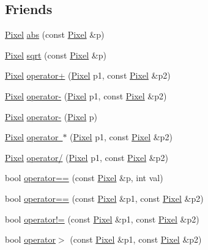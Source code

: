 \subsection*{Friends}
\begin{DoxyCompactItemize}
\item 
\mbox{\hyperlink{class_pixel}{Pixel}} \mbox{\hyperlink{class_pixel_ad6f6806d9c6750a8f5ac23e3d5733209}{abs}} (const \mbox{\hyperlink{class_pixel}{Pixel}} \&p)
\item 
\mbox{\hyperlink{class_pixel}{Pixel}} \mbox{\hyperlink{class_pixel_ac415923df8af4faf916a584a0f610c5a}{sqrt}} (const \mbox{\hyperlink{class_pixel}{Pixel}} \&p)
\item 
\mbox{\hyperlink{class_pixel}{Pixel}} \mbox{\hyperlink{class_pixel_abfbb0a3faab1f6b575e4f28b929eb95c}{operator+}} (\mbox{\hyperlink{class_pixel}{Pixel}} p1, const \mbox{\hyperlink{class_pixel}{Pixel}} \&p2)
\item 
\mbox{\hyperlink{class_pixel}{Pixel}} \mbox{\hyperlink{class_pixel_af819541eb6c95a1ee029f62c63e6dbca}{operator-\/}} (\mbox{\hyperlink{class_pixel}{Pixel}} p1, const \mbox{\hyperlink{class_pixel}{Pixel}} \&p2)
\item 
\mbox{\hyperlink{class_pixel}{Pixel}} \mbox{\hyperlink{class_pixel_a7936b70523ba5664cf90b70bf566879e}{operator-\/}} (\mbox{\hyperlink{class_pixel}{Pixel}} p)
\item 
\mbox{\hyperlink{class_pixel}{Pixel}} \mbox{\hyperlink{class_pixel_abcf09eaa1fe9387b959ea02b003c9d10}{operator $\ast$}} (\mbox{\hyperlink{class_pixel}{Pixel}} p1, const \mbox{\hyperlink{class_pixel}{Pixel}} \&p2)
\item 
\mbox{\hyperlink{class_pixel}{Pixel}} \mbox{\hyperlink{class_pixel_af34817f1230d64fb0bdfbe4641800a7c}{operator/}} (\mbox{\hyperlink{class_pixel}{Pixel}} p1, const \mbox{\hyperlink{class_pixel}{Pixel}} \&p2)
\item 
bool \mbox{\hyperlink{class_pixel_a055a296d7cc5f82c9f87fe1ec434a5f7}{operator==}} (const \mbox{\hyperlink{class_pixel}{Pixel}} \&p, int val)
\item 
bool \mbox{\hyperlink{class_pixel_ad9fdc4ca4a54c2cc05f02523eb3a6a9b}{operator==}} (const \mbox{\hyperlink{class_pixel}{Pixel}} \&p1, const \mbox{\hyperlink{class_pixel}{Pixel}} \&p2)
\item 
bool \mbox{\hyperlink{class_pixel_aaa61dbcbc3587ecba5a49edb8362c311}{operator!=}} (const \mbox{\hyperlink{class_pixel}{Pixel}} \&p1, const \mbox{\hyperlink{class_pixel}{Pixel}} \&p2)
\item 
bool \mbox{\hyperlink{class_pixel_a0ab6a49b7ff1d8f9af27154d09d89352}{operator$>$}} (const \mbox{\hyperlink{class_pixel}{Pixel}} \&p1, const \mbox{\hyperlink{class_pixel}{Pixel}} \&p2)

\end{DoxyCompactItemize}
